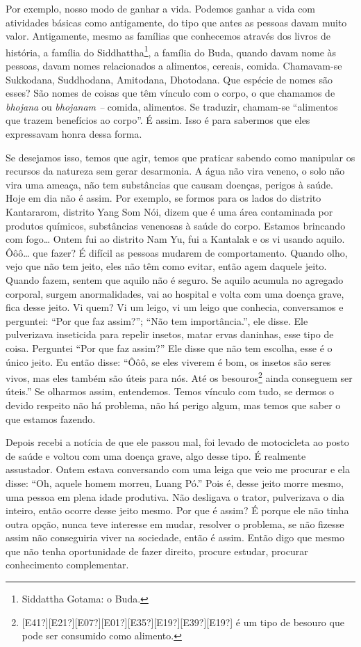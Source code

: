 Por exemplo, nosso modo de ganhar a vida. Podemos ganhar a vida com
atividades básicas como antigamente, do tipo que antes as pessoas davam
muito valor. Antigamente, mesmo as famílias que conhecemos através dos
livros de história, a família do Siddhattha\footnote{Siddattha Gotama:
o Buda.}, a família do Buda, quando davam nome às pessoas, davam nomes
relacionados a alimentos, cereais, comida. Chamavam-se Sukkodana,
Suddhodana, Amitodana, Dhotodana. Que espécie de nomes são esses? São
nomes de coisas que têm vínculo com o corpo, o que chamamos de
\textit{bhojana} ou \textit{bhojanam – }comida, alimentos. Se traduzir,
chamam-se “alimentos que trazem benefícios
ao corpo”. É assim. Isso é para sabermos que eles expressavam honra
dessa forma. 

Se desejamos isso, temos que agir, temos que praticar sabendo como
manipular os recursos da natureza sem gerar desarmonia. A água não vira
veneno, o solo não vira uma ameaça, não tem substâncias que causam
doenças, perigos à saúde. Hoje em dia não é assim. Por exemplo, se
formos para os lados do distrito Kantararom, distrito Yang Som Nói,
dizem que é uma área contaminada por produtos químicos, substâncias
venenosas à saúde do corpo. Estamos brincando com fogo… Ontem fui ao
distrito Nam Yu, fui a Kantalak e os vi usando aquilo. Ôôô… que fazer?
É difícil as pessoas mudarem de comportamento. Quando olho, vejo que
não tem jeito, eles não têm como evitar, então agem daquele jeito.
Quando fazem, sentem que aquilo não é seguro. Se aquilo acumula no
agregado corporal, surgem anormalidades, vai ao hospital e volta com
uma doença grave, fica desse jeito. Vi quem? Vi um leigo, vi um leigo
que conhecia, conversamos e perguntei: “Por que faz assim?”; “Não tem
importância.”, ele disse. Ele pulverizava inseticida para repelir
insetos, matar ervas daninhas, esse tipo de coisa. Perguntei “Por que
faz assim?” Ele disse que não tem escolha, esse é o único jeito. Eu
então disse: “Ôôô, se eles viverem é bom, os insetos são seres vivos,
mas eles também são úteis para nós. Até os
besouros\footnote{[E41?][E21?][E07?][E01?][E35?][E19?][E39?][E19?] é um
tipo de besouro que pode ser consumido como alimento.} ainda conseguem
ser úteis.” Se olharmos assim, entendemos. Temos vínculo com tudo, se
dermos o devido respeito não há problema, não há perigo algum, mas
temos que saber o que estamos fazendo. 

Depois recebi a notícia de que ele passou mal, foi levado de
motocicleta ao posto de saúde e voltou com uma doença grave, algo desse
tipo. É realmente assustador. Ontem estava conversando com uma leiga
que veio me procurar e ela disse: “Oh, aquele homem morreu, Luang Pó.”
Pois é, desse jeito morre mesmo, uma pessoa em plena idade produtiva.
Não desligava o trator, pulverizava o dia inteiro, então ocorre desse
jeito mesmo. Por que é assim? É porque ele não tinha outra opção, nunca
teve interesse em mudar, resolver o problema, se não fizesse assim não
conseguiria viver na sociedade, então é assim. Então digo que mesmo que
não tenha oportunidade de fazer direito, procure estudar, procurar
conhecimento complementar.

